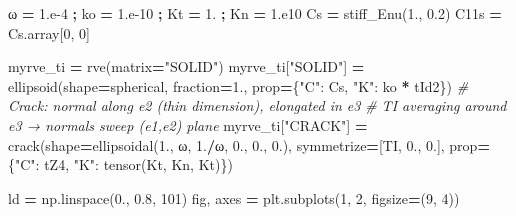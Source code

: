 \documentclass[
  a4paper,
  numbers=noendperiod,
  DIV=12]{scrreprt}
\newenvironment{Shaded}{\begin{snugshade}}{\end{snugshade}}
\newcommand{\CommentTok}[1]{\textcolor[rgb]{0.56,0.35,0.01}{\textit{#1}}}
\newcommand{\DecValTok}[1]{\textcolor[rgb]{0.00,0.00,0.81}{#1}}
\newcommand{\FloatTok}[1]{\textcolor[rgb]{0.00,0.00,0.81}{#1}}
\newcommand{\NormalTok}[1]{#1}
\newcommand{\OperatorTok}[1]{\textcolor[rgb]{0.81,0.36,0.00}{\textbf{#1}}}
\newcommand{\StringTok}[1]{\textcolor[rgb]{0.31,0.60,0.02}{#1}}
\begin{document}
\begin{Shaded}
\begin{Highlighting}[]
\NormalTok{ω }\OperatorTok{=} \FloatTok{1.e{-}4} \OperatorTok{;}\NormalTok{ ko }\OperatorTok{=} \FloatTok{1.e{-}10} \OperatorTok{;}\NormalTok{ Kt }\OperatorTok{=} \FloatTok{1.} \OperatorTok{;}\NormalTok{ Kn }\OperatorTok{=} \FloatTok{1.e10}
\NormalTok{Cs }\OperatorTok{=}\NormalTok{ stiff\_Enu(}\FloatTok{1.}\NormalTok{, }\FloatTok{0.2}\NormalTok{)}
\NormalTok{C11s }\OperatorTok{=}\NormalTok{ Cs.array[}\DecValTok{0}\NormalTok{, }\DecValTok{0}\NormalTok{]}

\NormalTok{myrve\_ti }\OperatorTok{=}\NormalTok{ rve(matrix}\OperatorTok{=}\StringTok{"SOLID"}\NormalTok{)}
\NormalTok{myrve\_ti[}\StringTok{"SOLID"}\NormalTok{] }\OperatorTok{=}\NormalTok{ ellipsoid(shape}\OperatorTok{=}\NormalTok{spherical, fraction}\OperatorTok{=}\FloatTok{1.}\NormalTok{,}
\NormalTok{                               prop}\OperatorTok{=}\NormalTok{\{}\StringTok{"C"}\NormalTok{: Cs, }\StringTok{"K"}\NormalTok{: ko }\OperatorTok{*}\NormalTok{ tId2\})}
\CommentTok{\# Crack: normal along e2 (thin dimension), elongated in e3}
\CommentTok{\# TI averaging around e3 → normals sweep (e1,e2) plane}
\NormalTok{myrve\_ti[}\StringTok{"CRACK"}\NormalTok{] }\OperatorTok{=}\NormalTok{ crack(shape}\OperatorTok{=}\NormalTok{ellipsoidal(}\FloatTok{1.}\NormalTok{, ω, }\FloatTok{1.}\OperatorTok{/}\NormalTok{ω, }\FloatTok{0.}\NormalTok{, }\FloatTok{0.}\NormalTok{, }\FloatTok{0.}\NormalTok{),}
\NormalTok{                           symmetrize}\OperatorTok{=}\NormalTok{[TI, }\FloatTok{0.}\NormalTok{, }\FloatTok{0.}\NormalTok{],}
\NormalTok{                           prop}\OperatorTok{=}\NormalTok{\{}\StringTok{"C"}\NormalTok{: tZ4, }\StringTok{"K"}\NormalTok{: tensor(Kt, Kn, Kt)\})}

\NormalTok{ld }\OperatorTok{=}\NormalTok{ np.linspace(}\FloatTok{0.}\NormalTok{, }\FloatTok{0.8}\NormalTok{, }\DecValTok{101}\NormalTok{)}
\NormalTok{fig, axes }\OperatorTok{=}\NormalTok{ plt.subplots(}\DecValTok{1}\NormalTok{, }\DecValTok{2}\NormalTok{, figsize}\OperatorTok{=}\NormalTok{(}\DecValTok{9}\NormalTok{, }\DecValTok{4}\NormalTok{))}


\end{Highlighting}
\end{Shaded}
\end{document}
